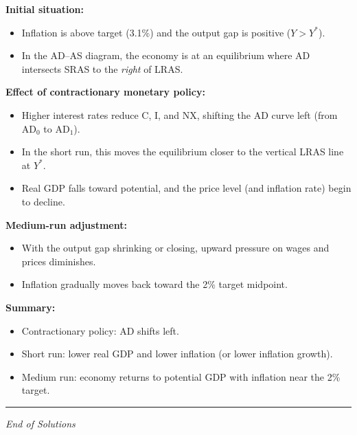 \documentclass[12pt]{article}
\begin{document}
\textbf{Initial situation:}
\begin{itemize}
    \item Inflation is above target (3.1\%) and the output gap is positive (\(Y > Y^*\)).
    \item In the AD--AS diagram, the economy is at an equilibrium where AD intersects SRAS to the \emph{right} of LRAS.
\end{itemize}

\textbf{Effect of contractionary monetary policy:}
\begin{itemize}
    \item Higher interest rates reduce C, I, and NX, shifting the AD curve left (from AD\(_0\) to AD\(_1\)).
    \item In the short run, this moves the equilibrium closer to the vertical LRAS line at \(Y^*\).
    \item Real GDP falls toward potential, and the price level (and inflation rate) begin to decline.
\end{itemize}

\textbf{Medium-run adjustment:}
\begin{itemize}
    \item With the output gap shrinking or closing, upward pressure on wages and prices diminishes.
    \item Inflation gradually moves back toward the 2\% target midpoint.
\end{itemize}

\textbf{Summary:}
\begin{itemize}
    \item Contractionary policy: AD shifts left.
    \item Short run: lower real GDP and lower inflation (or lower inflation growth).
    \item Medium run: economy returns to potential GDP with inflation near the 2\% target.
\end{itemize}

\hrule
\vspace{1em}

\begin{center}
\textit{End of Solutions}
\end{center}
\end{document}
